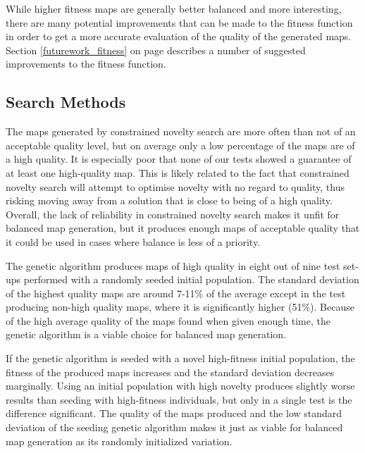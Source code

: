 
While higher fitness maps are generally better balanced and more interesting, there are many potential improvements that can be made to the fitness function in order to get a more accurate evaluation of the quality of the generated maps. Section \ref{futurework_fitness} on page \pageref{futurework_fitness} describes a number of suggested improvements to the fitness function.

\subsection{Search Methods}
\label{discussion_quality_searchmethods}
The maps generated by constrained novelty search are more often than not of an acceptable quality level, but on average only a low percentage of the maps are of a high quality. It is especially poor that none of our tests showed a guarantee of at least one high-quality map. This is likely related to the fact that constrained novelty search will attempt to optimise novelty with no regard to quality, thus risking moving away from a solution that is close to being of a high quality. Overall, the lack of reliability in constrained novelty search makes it unfit for balanced map generation, but it produces enough maps of acceptable quality that it could be used in cases where balance is less of a priority.

The genetic algorithm produces maps of high quality in eight out of nine test set-ups performed with a randomly seeded initial population. The standard deviation of the highest quality maps are around 7-11\% of the average except in the test producing non-high quality maps, where it is significantly higher (51\%). Because of the high average quality of the maps found when given enough time, the genetic algorithm is a viable choice for balanced map generation. 

If the genetic algorithm is seeded with a novel high-fitness initial population, the fitness of the produced maps increases and the standard deviation decreases marginally. Using an initial population with high novelty produces slightly worse results than seeding with high-fitness individuals, but only in a single test is the difference significant. The quality of the maps produced and the low standard deviation of the seeding genetic algorithm makes it just as viable for balanced map generation as its randomly initialized variation.

